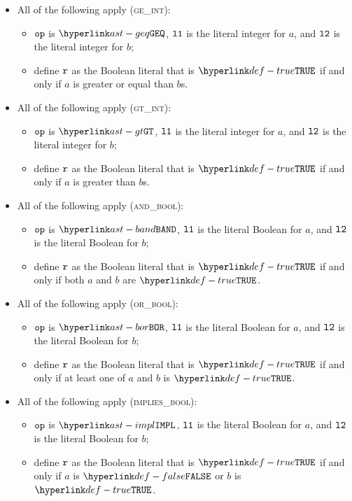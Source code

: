 \begin{itemize}
  \item All of the following apply (\textsc{ge\_int}):
  \begin{itemize}
    \item $\texttt{op}$ is $\GEQ$, $\texttt{l1}$ is the literal integer for $a$, and $\texttt{l2}$ is the literal integer for $b$;
    \item define $\texttt{r}$ as the Boolean literal that is $\True$ if and only if $a$ is greater or equal than $b$s.
  \end{itemize}

  \item All of the following apply (\textsc{gt\_int}):
  \begin{itemize}
    \item $\texttt{op}$ is $\GT$, $\texttt{l1}$ is the literal integer for $a$, and $\texttt{l2}$ is the literal integer for $b$;
    \item define $\texttt{r}$ as the Boolean literal that is $\True$ if and only if $a$ is greater than $b$s.
  \end{itemize}

  \item All of the following apply (\textsc{and\_bool}):
  \begin{itemize}
    \item $\texttt{op}$ is $\BAND$, $\texttt{l1}$ is the literal Boolean for $a$, and $\texttt{l2}$ is the literal Boolean for $b$;
    \item define $\texttt{r}$ as the Boolean literal that is $\True$ if and only if both $a$ and $b$ are $\True$.
  \end{itemize}

  \item All of the following apply (\textsc{or\_bool}):
  \begin{itemize}
    \item $\texttt{op}$ is $\BOR$, $\texttt{l1}$ is the literal Boolean for $a$, and $\texttt{l2}$ is the literal Boolean for $b$;
    \item define $\texttt{r}$ as the Boolean literal that is $\True$ if and only if at least one of $a$ and $b$ is $\True$.
  \end{itemize}

  \item All of the following apply (\textsc{implies\_bool}):
  \begin{itemize}
    \item $\texttt{op}$ is $\IMPL$, $\texttt{l1}$ is the literal Boolean for $a$, and $\texttt{l2}$ is the literal Boolean for $b$;
    \item define $\texttt{r}$ as the Boolean literal that is $\True$ if and only if $a$ is $\False$ or $b$ is $\True$.
  \end{itemize}


\end{itemize}
